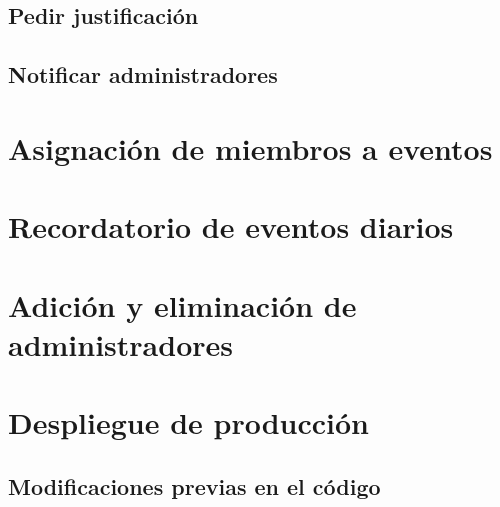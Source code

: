 \subsection{Pedir justificación}

\subsection{Notificar administradores}

\section{Asignación de miembros a eventos}


\section{Recordatorio de eventos diarios}

\section{Adición y eliminación de administradores}




\section{Despliegue de producción}

\subsection{Modificaciones previas en el código}


